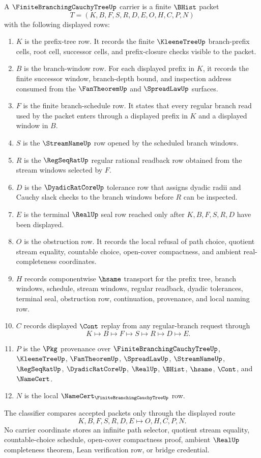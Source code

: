 \begin{definition}
\label{def:finite-branching-cauchy-tree-carrier}
A $\FiniteBranchingCauchyTreeUp$ carrier is a finite $\BHist$ packet
$$
T=(K,B,F,S,R,D,E,O,H,C,P,N)
$$
with the following displayed rows:
\begin{enumerate}
\item $K$ is the prefix-tree row. It records the finite $\KleeneTreeUp$ branch-prefix cells, root cell, successor cells, and prefix-closure checks visible to the packet.
\item $B$ is the branch-window row. For each displayed prefix in $K$, it records the finite successor window, branch-depth bound, and inspection address consumed from the $\FanTheoremUp$ and $\SpreadLawUp$ surfaces.
\item $F$ is the finite branch-schedule row. It states that every regular branch read used by the packet enters through a displayed prefix in $K$ and a displayed window in $B$.
\item $S$ is the $\StreamNameUp$ row opened by the scheduled branch windows.
\item $R$ is the $\RegSeqRatUp$ regular rational readback row obtained from the stream windows selected by $F$.
\item $D$ is the $\DyadicRatCoreUp$ tolerance row that assigns dyadic radii and Cauchy slack checks to the branch windows before $R$ can be inspected.
\item $E$ is the terminal $\RealUp$ seal row reached only after $K,B,F,S,R,D$ have been displayed.
\item $O$ is the obstruction row. It records the local refusal of path choice, quotient stream equality, countable choice, open-cover compactness, and ambient real-completeness coordinates.
\item $H$ records componentwise $\hsame$ transport for the prefix tree, branch windows, schedule, stream windows, regular readback, dyadic tolerances, terminal seal, obstruction row, continuation, provenance, and local naming row.
\item $C$ records displayed $\Cont$ replay from any regular-branch request through
$$
K\longmapsto B\longmapsto F\longmapsto S\longmapsto R\longmapsto D\longmapsto E .
$$
\item $P$ is the $\Pkg$ provenance over $\FiniteBranchingCauchyTreeUp$, $\KleeneTreeUp$, $\FanTheoremUp$, $\SpreadLawUp$, $\StreamNameUp$, $\RegSeqRatUp$, $\DyadicRatCoreUp$, $\RealUp$, $\BHist$, $\hsame$, $\Cont$, and $\NameCert$.
\item $N$ is the local $\NameCert_{\FiniteBranchingCauchyTreeUp}$ row.
\end{enumerate}
The classifier compares accepted packets only through the displayed route
$$
K,B,F,S,R,D,E \longmapsto O,H,C,P,N .
$$
No carrier coordinate stores an infinite path selector, quotient stream equality, countable-choice schedule, open-cover compactness proof, ambient $\RealUp$ completeness theorem, Lean verification row, or bridge credential.
\end{definition}

